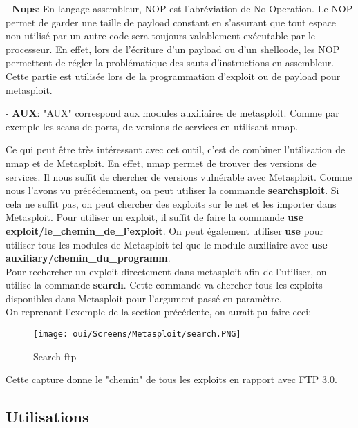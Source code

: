 - \textbf{Nops}: En langage assembleur, NOP est l'abréviation de No Operation. Le NOP permet de garder une taille de payload constant en s'assurant que tout espace non utilisé par un autre code sera toujours valablement exécutable par le processeur. En effet, lors de l'écriture d'un payload ou d'un shellcode, les NOP permettent de régler la problématique des sauts d'instructions en assembleur. Cette partie est utilisée lors de la programmation d'exploit ou de payload pour metasploit.

- \textbf{AUX}: "AUX" correspond aux modules auxiliaires de metasploit. Comme par exemple les scans de ports, de versions de services en utilisant nmap.

Ce qui peut être très intéressant avec cet outil, c'est de combiner l'utilisation de nmap et de Metasploit. En effet, nmap permet de trouver des versions de services. Il nous suffit de chercher de versions vulnérable avec Metasploit. Comme nous l'avons vu précédemment, on peut utiliser la commande \textbf{searchsploit}. Si cela ne suffit pas, on peut chercher des exploits sur le net et les importer dans Metasploit. Pour utiliser un exploit, il suffit de faire la commande \textbf{use exploit/le\_chemin\_de\_l'exploit}. On peut également utiliser \textbf{use} pour utiliser tous les modules de Metasploit tel que le module auxiliaire avec \textbf{use auxiliary/chemin\_du\_programm}.\\

Pour rechercher un exploit directement dans metasploit afin de l'utiliser, on utilise la commande \textbf{search}. Cette commande va chercher tous les exploits disponibles dans Metasploit pour l'argument passé en paramètre.\\ 

\noindent On reprenant l'exemple de la section précédente, on aurait pu faire ceci:

\begin{figure}[htp!]
  \centering
  \setlength\figureheight{7cm}
  \setlength\figurewidth{9cm}
  \texttt{[image: oui/Screens/Metasploit/search.PNG]}
  \caption{Search ftp}
  \label{fig:courbe-tikz}
\end{figure}

Cette capture donne le "chemin" de tous les exploits en rapport avec FTP 3.0.

\subsection{Utilisations}

